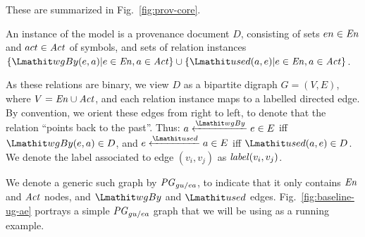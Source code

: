 These are summarized in Fig.~\ref{fig:prov-core}.
%


%
An instance  of the model is a provenance document $D$, consisting of sets $en \in \mathit{En}$ and $act \in \mathit{Act}$ of symbols, and sets of relation instances $\{ \wgby(e,a)  | e \in \en, a \in \act \} \cup   \{ \used(a,e)  | e \in \en, a \in \act\}$. 

%
As these relations are binary, we view $D$ as a bipartite digraph $G=(V,E)$, where $V= \mathit{En} \cup \mathit{Act}$, and each relation instance maps to a labelled directed edge. By convention, we orient these edges from right to left, to denote that the relation ``points back to the past''. Thus:
$a \xleftarrow{\wgby} e \in E$ iff $\wgby(e,a) \in D$, and $e \xleftarrow{\used} a \in E$ iff $\used(a,e) \in D$.
%
We denote the label associated to edge $(v_i, v_j)$ as $\mathit{label}(v_i,v_j)$. 

We denote a generic such graph by $\mathit{PG}_{gu/ea}$, to indicate that it only contains $\mathit{En}$ and $\mathit{Act}$ nodes, and $\wgby$ and $\used$ edges.
Fig.~\ref{fig:baseline-ug-ae} portrays a simple $\mathit{PG}_{gu/ea}$ graph that we will be using as a running example. %


